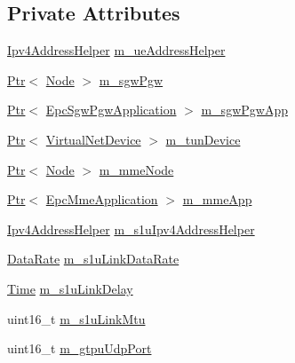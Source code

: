 \subsection*{Private Attributes}
\begin{DoxyCompactItemize}
\item 
\hyperlink{classns3_1_1Ipv4AddressHelper}{Ipv4\+Address\+Helper} \hyperlink{classns3_1_1MmWavePointToPointEpcHelper_aac0f6361775ae1a148c4faec26f58fc6}{m\+\_\+ue\+Address\+Helper}
\item 
\hyperlink{classns3_1_1Ptr}{Ptr}$<$ \hyperlink{classns3_1_1Node}{Node} $>$ \hyperlink{classns3_1_1MmWavePointToPointEpcHelper_a164b7ce64e19868995296d492e7ddd21}{m\+\_\+sgw\+Pgw}
\item 
\hyperlink{classns3_1_1Ptr}{Ptr}$<$ \hyperlink{classns3_1_1EpcSgwPgwApplication}{Epc\+Sgw\+Pgw\+Application} $>$ \hyperlink{classns3_1_1MmWavePointToPointEpcHelper_a91427a039a393a8e4faaf4d08813d929}{m\+\_\+sgw\+Pgw\+App}
\item 
\hyperlink{classns3_1_1Ptr}{Ptr}$<$ \hyperlink{classns3_1_1VirtualNetDevice}{Virtual\+Net\+Device} $>$ \hyperlink{classns3_1_1MmWavePointToPointEpcHelper_acdac8e4f1564927bfe05c2a04511394b}{m\+\_\+tun\+Device}
\item 
\hyperlink{classns3_1_1Ptr}{Ptr}$<$ \hyperlink{classns3_1_1Node}{Node} $>$ \hyperlink{classns3_1_1MmWavePointToPointEpcHelper_a4e2e32e1abb0ca817e30be4eb46ebfd0}{m\+\_\+mme\+Node}
\item 
\hyperlink{classns3_1_1Ptr}{Ptr}$<$ \hyperlink{classns3_1_1EpcMmeApplication}{Epc\+Mme\+Application} $>$ \hyperlink{classns3_1_1MmWavePointToPointEpcHelper_acee46bd21104461e8b459a309815dea9}{m\+\_\+mme\+App}
\item 
\hyperlink{classns3_1_1Ipv4AddressHelper}{Ipv4\+Address\+Helper} \hyperlink{classns3_1_1MmWavePointToPointEpcHelper_ac6d52e4132f31a255661f788c69be95b}{m\+\_\+s1u\+Ipv4\+Address\+Helper}
\item 
\hyperlink{classns3_1_1DataRate}{Data\+Rate} \hyperlink{classns3_1_1MmWavePointToPointEpcHelper_a6350505bc847c3c88cd0cb44de1809f7}{m\+\_\+s1u\+Link\+Data\+Rate}
\item 
\hyperlink{classns3_1_1Time}{Time} \hyperlink{classns3_1_1MmWavePointToPointEpcHelper_ac3ac70052255531fa75d5cd0b716d54b}{m\+\_\+s1u\+Link\+Delay}
\item 
uint16\+\_\+t \hyperlink{classns3_1_1MmWavePointToPointEpcHelper_a3caa07a7eb4129570763154b1d6c2630}{m\+\_\+s1u\+Link\+Mtu}
\item 
uint16\+\_\+t \hyperlink{classns3_1_1MmWavePointToPointEpcHelper_af751b4022bf80a9ea76f18805534a9d0}{m\+\_\+gtpu\+Udp\+Port}

\end{DoxyCompactItemize}
